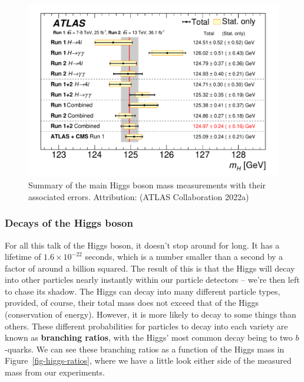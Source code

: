 \documentclass[
  11pt,
  numbers=noendperiod]{book}
\begin{document}
\begin{figure}

{\centering \includegraphics{./images/higgsmass.pdf}

}

\caption{\label{fig-higgs-mass}Summary of the main Higgs boson mass
measurements with their associated errors. Attribution: (ATLAS
Collaboration 2022a)}

\end{figure}

\hypertarget{decays-of-the-higgs-boson}{%
\subsubsection*{Decays of the Higgs
boson}\label{decays-of-the-higgs-boson}}

For all this talk of the Higgs boson, it doesn't stop around for long.
It has a lifetime of \(1.6 \times 10^{-22}\) seconds, which is a number
smaller than a second by a factor of around a billion squared. The
result of this is that the Higgs will decay into other particles nearly
instantly within our particle detectors -- we're then left to chase its
shadow. The Higgs can decay into many different particle types,
provided, of course, their total mass does not exceed that of the Higgs
(conservation of energy). However, it is more likely to decay to some
things than others. These different probabilities for particles to decay
into each variety are known as \textbf{branching ratios}, with the
Higgs' most common decay being to two \(b\)-quarks. We can see these
branching ratios as a function of the Higgs mass in
Figure~\ref{fig-higgs-ratios}, where we have a little look either side
of the measured mass from our experiments.
\end{document}
